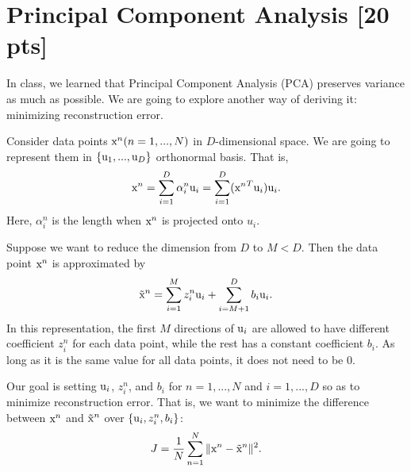 \documentclass[twoside,10pt]{article}
\begin{document}

\newpage
\section{Principal Component Analysis [20 pts]}
In class, we learned that Principal Component Analysis (PCA)
preserves variance as much as possible. We are going to explore
another way of deriving it: minimizing reconstruction error.

Consider data points $\text x^n (n=1, ..., N)$ in $D$-dimensional space.
We are going to represent them in $\{\text u_1, ..., \text u_D\}$ orthonormal basis.
That is,
\begin{equation} \nonumber
\text x^n = \sum_{i=1}^D \alpha_i^n \text u_i = \sum_{i=1}^D ({\text x^n}^T \text u_i) \text u_i.
\end{equation}
Here, $\alpha^n_i$ is the length when $\text x^n$ is projected onto
$u_i$.

Suppose we want to reduce the dimension from $D$ to $M < D$. Then
the data point $\text x^n$ is approximated by
\begin{equation} \nonumber
\tilde{\text x}^n = \sum_{i=1}^M z_i^n \text u_i + \sum_{i=M+1}^D b_i \text u_i.
\end{equation}
In this representation, the first $M$ directions of $\text u_i$ are
allowed to have different coefficient $z^n_i$ for each data point,
while the rest has a constant coefficient $b_i$. As long as it is
the same value for all data points, it does not need to be 0.

Our goal is setting $\text u_i$, $z^n_i$, and $b_i$ for $n = 1,..., N$
and $i = 1, ..., D$ so as to minimize reconstruction error. That is,
we want to minimize the difference between $\text x^n$ and $\tilde{\text x}^n$ over $\{ \text u_i, z^n_i, b_i \}$:
\begin{equation} \nonumber
J = \frac{1}{N} \sum_{n=1}^N \| \text x^n - \tilde{\text x}^n \|^2.
\end{equation}
\end{document}
